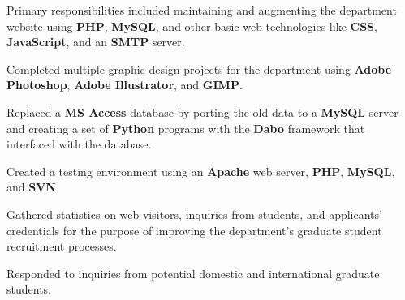 


\begin{rExperience}

  \item Primary responsibilities included maintaining and augmenting the department website using \textbf{PHP}, \textbf{MySQL}, and other basic web technologies like \textbf{CSS}, \textbf{JavaScript}, and an \textbf{SMTP} server.

  \item Completed multiple graphic design projects for the department using \textbf{Adobe Photoshop}, \textbf{Adobe Illustrator}, and \textbf{GIMP}.

  \begin{CVonly}

  \item Replaced a \textbf{MS Access} database by porting the old data to a \textbf{MySQL} server and creating a set of \textbf{Python} programs with the \textbf{Dabo} framework that interfaced with the database.


  \item Created a testing environment using an \textbf{Apache} web server, \textbf{PHP}, \textbf{MySQL}, and \textbf{SVN}.

  \item Gathered statistics on web visitors, inquiries from students, and applicants' credentials for the purpose of improving the department's graduate student recruitment processes.

  \item Responded to inquiries from potential domestic and international graduate students.

  \end{CVonly}

\end{rExperience}
